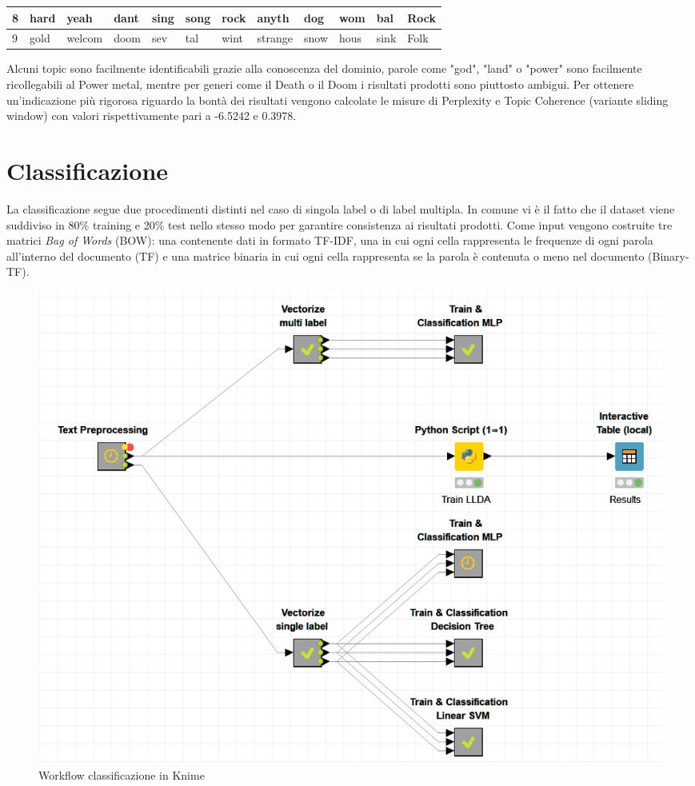 \documentclass[technote]{IEEEtran}
\begin{document}
\begin{table}[H]
{\begin{tabular}{|l||llllllllll||l|}
8        & hard                  & yeah                  & dant                  & sing                  & song                  & rock                  & anyth                 & dog                   & wom                   & bal  & Rock            \\ \hline
9        & gold                  & welcom                & doom                  & sev                   & tal                   & wint                  & strange               & snow                  & hous                  & sink & Folk            \\ \hline
\end{tabular}
}
\label{t_topic_label}
\end{table}
Alcuni topic sono facilmente identificabili grazie alla conoscenza del dominio, parole come "god", "land" o "power" sono facilmente ricollegabili al Power metal, mentre per generi come il Death o il Doom i risultati prodotti sono piuttosto ambigui. Per ottenere un'indicazione più rigorosa riguardo la bontà dei risultati vengono calcolate le misure di Perplexity e Topic Coherence (variante sliding window) con valori rispettivamente pari a -6.5242 e 0.3978.
\section{Classificazione}
La classificazione segue due procedimenti distinti nel caso di singola label o di label multipla. In comune vi è il fatto che il dataset viene suddiviso in 80\% training e 20\% test nello stesso modo per garantire consistenza ai risultati prodotti.
Come input vengono costruite tre matrici \textit{Bag of Words} (BOW): una contenente dati in formato TF-IDF, una in cui ogni cella rappresenta le frequenze di ogni parola all'interno del documento (TF) e una matrice binaria in cui ogni cella rappresenta se la parola è contenuta o meno nel documento (Binary-TF).
\begin{figure}[H]
\centerline{\includegraphics[width=1\columnwidth]{images/knime}}
\caption{Workflow classificazione in Knime}
\label{fig_knime_class}
\end{figure}
\end{document}

